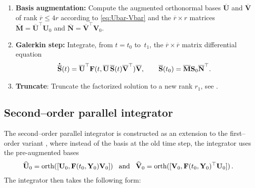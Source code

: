 \documentclass[preprint,runningheads]{svjour3}
\newcommand*{\dt}[1]{ \accentset{\mbox{\large\bfseries .}}{#1}}
\def\wh{\widehat}
\def\wt{\widetilde}
\def\wt{\overline}
\newcommand\bfF{{\mathbf F}}
\newcommand\bfM{{\mathbf M}}
\newcommand\bfN{{\mathbf N}}
\newcommand\bfS{{\mathbf S}}
\newcommand\bfU{{\mathbf U}}
\newcommand\bfV{{\mathbf V}}
\newcommand\bfY{{\mathbf Y}}
\begin{document}
\begin{enumerate}
\item {\bf Basis augmentation:} Compute the augmented orthonormal bases $\wt \bfU$ and $\wt \bfV$ of rank $\wt r \le 4r$ according to \eqref{eq:Ubar-Vbar} and the $\wt r \times r$ matrices $\wt \bfM=\wt \bfU^\top \bfU_0$ and $\wt\bfN=\wt \bfV^\top \bfV_0$.
\item {\bf Galerkin step:} Integrate, from $t=t_0$ to~$t_1$, the $\wt r \times \wt r$ matrix differential equation
		\begin{equation}\label{bar-S-step} 
		\dt{\wt\bfS}(t) =  \wt\bfU^\top \bfF(t, \wt\bfU \, \wt\bfS(t) \wt\bfV^\top) \wt\bfV, 
		\qquad \wt\bfS(t_0) = \wt\bfM \bfS_0 \wt\bfN^\top.
		\end{equation}
\item \textbf{Truncate}: Truncate the factorized solution to a new rank $r_1$, see \cite{ceruti2023rank}.
\end{enumerate}

\subsection{Second--order parallel integrator}
The second--order parallel integrator is constructed as an extension to the first--order variant \cite{CeKL23}, where instead of the basis at the old time step, the integrator uses the pre-augmented bases
\begin{align}\label{eq:pre-aug-bases}
    \wh\bfU_0 = \text{orth}([\bfU_0, \bfF(t_0,\bfY_0)\bfV_0]) \enskip\text{ and }\enskip \wh\bfV_0 = \text{orth}([\bfV_0, \bfF(t_0,\bfY_0)^{\top}\bfU_0])\,.
\end{align}
The integrator then takes the following form:
\end{document}
